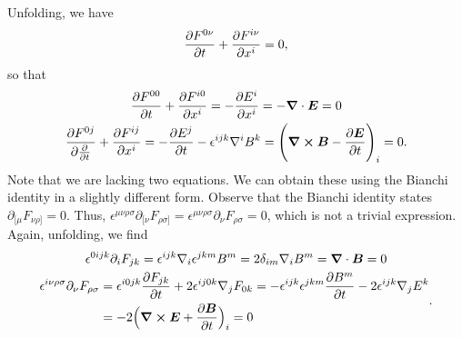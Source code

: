 {Unfolding, we have
\begin{align}
    \pdv{F^{0\nu}}{t} + \pdv{F^{i\nu}}{x^{i}} = 0
,\end{align}
so that
\begin{gather}
    \pdv{F^{00}}{t} + \pdv{F^{i 0}}{x^{i}} = -\pdv{E^{i}}{x^{i}} = -\grad \cdot \vb*{E} = 0 \nonumber \\
    \pdv{F^{0j}}{\pdv{t}} + \pdv{F^{ij}}{x^{i}} = -\pdv{E^{j}}{t} - \epsilon^{ijk} \nabla^{i} B^{k} = \Bigg( \grad \cross \vb*{B} - \pdv{\vb*{E}}{t} \Bigg)_{i} = 0
.\end{gather}
Note that we are lacking two equations.
We can obtain these using the Bianchi identity in a slightly different form.
Observe that the Bianchi identity states $\partial_{[\mu} F_{\nu\rho]} = 0$.
Thus, $\epsilon^{\mu\nu\rho\sigma} \partial_{[\nu} F_{\rho\sigma]} = \epsilon^{\mu\nu\rho\sigma} \partial_{\nu} F_{\rho\sigma} = 0$, which is not a trivial expression.
Again, unfolding, we find
\begin{gather}
    \epsilon^{0ijk} \partial_{i} F_{jk} = \epsilon^{ijk} \nabla_{i} \epsilon^{jkm} B^{m} = 2 \delta_{im} \nabla_{i} B^{m} = \grad \cdot \vb*{B} = 0 \nonumber \\
    \begin{aligned}    
        \epsilon^{i\nu\rho\sigma} \partial_{\nu} F_{\rho\sigma} &= \epsilon^{i 0 jk} \pdv{F_{jk}}{t} + 2 \epsilon^{ij 0k} \nabla_{j} F_{0k} = -\epsilon^{ijk} \epsilon^{jkm} \pdv{B^{m}}{t} - 2 \epsilon^{ijk} \nabla_{j} E^{k} \nonumber \\
                                                                &= -2 \Big( \grad \cross \vb*{E} + \pdv{\vb*{B}}{t} \Big)_{i} = 0
    \end{aligned}
.\end{gather}

}
